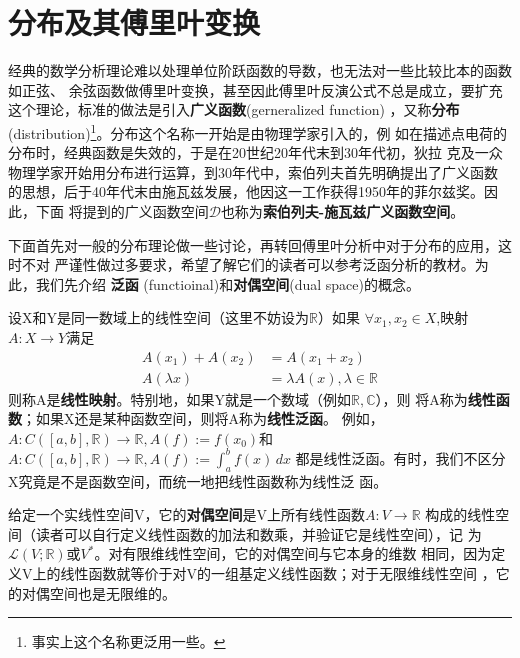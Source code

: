 \documentclass{ctexbook}
\begin{document}

\section{分布及其傅里叶变换}\label{sec:distributions}

经典的数学分析理论难以处理单位阶跃函数的导数，也无法对一些比较比本的函数如正弦、
余弦函数做傅里叶变换，甚至因此傅里叶反演公式不总是成立，要扩充这个理论，标准的做法是引入\textbf{广义函数}(gerneralized function)
，又称\textbf{分布}(distribution)\footnote{事实上这个名称更泛用一些。}。分布这个名称一开始是由物理学家引入的，例
如在描述点电荷的分布时，经典函数是失效的，于是在20世纪20年代末到30年代初，狄拉
克及一众物理学家开始用分布进行运算，到30年代中，索伯列夫首先明确提出了广义函数
的思想，后于40年代末由施瓦兹发展，他因这一工作获得1950年的菲尔兹奖。因此，下面
将提到的广义函数空间$\mathcal{D} $也称为\textbf{索伯列夫-施瓦兹广义函数空间}。

下面首先对一般的分布理论做一些讨论，再转回傅里叶分析中对于分布的应用，这时不对
严谨性做过多要求，希望了解它们的读者可以参考泛函分析的教材。为此，我们先介绍
\textbf{泛函} (functioinal)和\textbf{对偶空间}(dual space)的概念。

设X和Y是同一数域上的线性空间（这里不妨设为$\mathbb{R}$）如果
$\forall x_1,x_2\in X$,映射$A:X\to Y$满足
\begin{align*}
    A(x_1)+A(x_2) & =A(x_1+x_2)                        \\
    A(\lambda x)  & =\lambda A(x),\lambda\in\mathbb{R}
\end{align*}
则称A是\textbf{线性映射}。特别地，如果Y就是一个数域（例如$\mathbb{R,C}$），则
将A称为\textbf{线性函数}；如果X还是某种函数空间，则将A称为\textbf{线性泛函}。
例如，$A:C([a,b],\mathbb{R})\to\mathbb{R},A(f):=f(x_0)$和$A:C([a,b],\mathbb{R})\to\mathbb{R},A(f):=\int_{a}^{b}f(x)\,dx$
都是线性泛函。有时，我们不区分X究竟是不是函数空间，而统一地把线性函数称为线性泛
函。

给定一个实线性空间V，它的\textbf{对偶空间}是V上所有线性函数$A:V\to\mathbb{R}$
构成的线性空间（读者可以自行定义线性函数的加法和数乘，并验证它是线性空间），记
为$\mathcal{L} (V;\mathbb{R})$或$V^*$。对有限维线性空间，它的对偶空间与它本身的维数
相同，因为定义V上的线性函数就等价于对V的一组基定义线性函数；对于无限维线性空间
，它的对偶空间也是无限维的。
\end{document}
